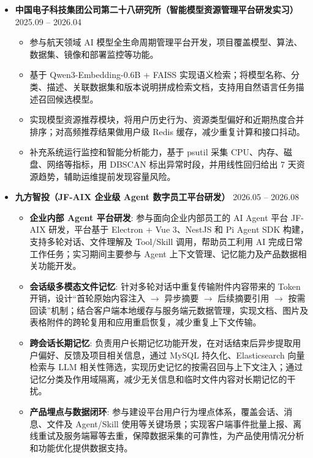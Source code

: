 \documentclass[zh]{resume}
\begin{document}
\begin{itemize}
  \item \textbf{中国电子科技集团公司第二十八研究所（智能模型资源管理平台研发实习）} \hfill 2025.09 -- 2026.04
  \begin{itemize}
    \item 参与航天领域 AI 模型全生命周期管理平台开发，项目覆盖模型、算法、数据集、镜像和部署监控等功能。
    \item 基于 Qwen3-Embedding-0.6B + FAISS 实现语义检索；将模型名称、分类、描述、关联数据集和版本说明拼成检索文档，支持用自然语言任务描述召回候选模型。
    \item 实现模型资源推荐模块，将用户历史行为、资源类型偏好和近期热度合并排序；对高频推荐结果做用户级 Redis 缓存，减少重复计算和接口抖动。
    \item 补充系统运行监控和智能分析能力，基于 psutil 采集 CPU、内存、磁盘、网络等指标，用 DBSCAN 标出异常时段，并用线性回归给出 7 天资源趋势，辅助运维提前发现容量风险。
  \end{itemize}

  \item \textbf{九方智投（JF-AIX 企业级 Agent 数字员工平台研发）} \hfill 2026.05 -- 2026.08
  \begin{itemize}
    \item \textbf{企业内部 Agent 平台研发}: 参与面向企业内部员工的 AI Agent 平台 JF-AIX 研发，平台基于 Electron + Vue 3、NestJS 和 Pi Agent SDK 构建，支持多轮对话、文件理解及 Tool/Skill 调用，帮助员工利用 AI 完成日常工作任务；实习期间主要参与 Agent 上下文管理、记忆能力及产品数据相关功能开发。
    \item \textbf{会话级多模态文件记忆}: 针对多轮对话中重复传输附件内容带来的 Token 开销，设计``首轮原始内容注入 $\rightarrow$ 异步摘要 $\rightarrow$ 后续摘要引用 $\rightarrow$ 按需回读''机制；结合客户端本地缓存与服务端元数据管理，实现文档、图片及表格附件的跨轮复用和应用重启恢复，减少重复上下文传输。
    \item \textbf{跨会话长期记忆}: 负责用户长期记忆功能开发，在对话结束后异步提取用户偏好、反馈及项目相关信息，通过 MySQL 持久化、Elasticsearch 向量检索与 LLM 相关性筛选，实现历史记忆的按需召回与上下文注入；通过记忆分类及作用域隔离，减少无关信息和临时文件内容对长期记忆的干扰。
    \item \textbf{产品埋点与数据闭环}: 参与建设平台用户行为埋点体系，覆盖会话、消息、文件及 Agent/Skill 使用等关键场景；实现客户端事件批量上报、离线重试及服务端幂等去重，保障数据采集的可靠性，为产品使用情况分析和功能优化提供数据支持。
  \end{itemize}
\end{itemize}
\end{document}
